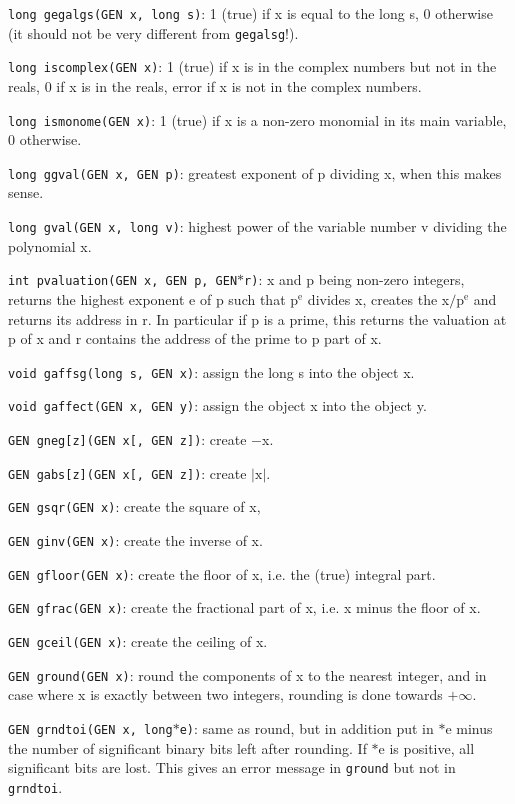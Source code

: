 {\tt long gegalgs(GEN x, long s)}: 1 (true) if x is equal to the long s, 0
otherwise (it should not be very different from {\tt gegalsg}!).

{\tt long iscomplex(GEN x)}: 1 (true) if x is in the complex numbers but not
in the reals, 0 if x is in the reals, error if x is not in the complex numbers.

{\tt long ismonome(GEN x)}: 1 (true) if x is a non-zero monomial in its main
variable, 0 otherwise.

{\tt long ggval(GEN x, GEN p)}: greatest exponent of p dividing x, when this
makes sense.

{\tt long gval(GEN x, long v)}: highest power of the variable number v dividing
the polynomial x.

{\tt int pvaluation(GEN x, GEN p, GEN$*$r)}: x and p being non-zero
integers, returns the highest exponent e of p such that p$^{\text{e}}$ 
divides x, creates the x$/\text{p}^{\text{e}}$ and returns its address 
in r. In particular if p is a prime, this returns the valuation at p of
x and r contains the address of the prime to p part of x.


{\tt void gaffsg(long s, GEN x)}: assign the long s into the object x.

{\tt void gaffect(GEN x, GEN y)}: assign the object x into the object y.


{\tt GEN gneg[z](GEN x[, GEN z])}: create $-$x.

{\tt GEN gabs[z](GEN x[, GEN z])}: create $|\text{x}|$.

{\tt GEN gsqr(GEN x)}: create the square of x,

{\tt GEN ginv(GEN x)}: create the inverse of x.

{\tt GEN gfloor(GEN x)}: create the floor of x, i.e. the (true) integral part.

{\tt GEN gfrac(GEN x)}: create the fractional part of x, i.e. x minus the floor
of x.

{\tt GEN gceil(GEN x)}: create the ceiling of x.

{\tt GEN ground(GEN x)}: round the components of x to the nearest integer,
and in case where x is exactly between two integers, rounding is done
towards $+\infty$.

{\tt GEN grndtoi(GEN x, long$*$e)}: same as round, but in addition put in
$*$e minus the number of significant binary bits left after rounding. If
$*$e is positive, all significant bits are lost. This gives an error message
in {\tt ground} but not in {\tt grndtoi}.

